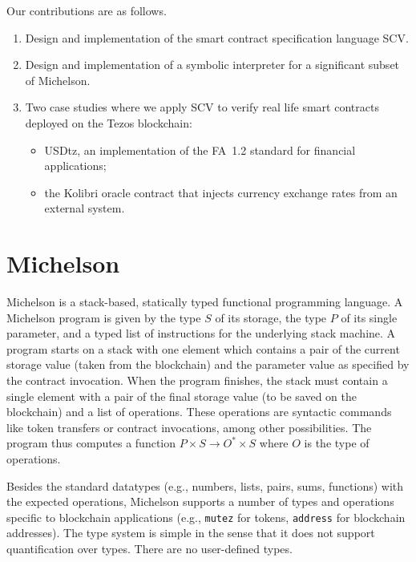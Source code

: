 \documentclass[a4paper,USenglish,cleveref, autoref, thm-restate]{lipics-v2021}
\begin{document}
Our contributions are as follows.
\begin{enumerate}
\item Design and implementation of the smart contract specification
  language SCV.
\item Design and implementation of a symbolic interpreter for a
  significant subset of Michelson.
\item Two case studies where we apply SCV to verify real life smart
  contracts deployed on the Tezos blockchain:
  \begin{itemize}
  \item USDtz, an implementation of the FA~1.2 standard for financial
    applications;
  \item the Kolibri oracle contract that injects currency exchange
    rates from an external system.
  \end{itemize}
\end{enumerate}

\section{Michelson}
\label{sec:background}
\lstset{language=michelson}

Michelson is a stack-based, statically typed functional programming language.
A Michelson program is given by the type $S$ of its storage, the type $P$ of its single
parameter, and a typed list of instructions for the underlying stack machine.
A program starts on a stack with one element which contains a pair of
the current storage value (taken from the blockchain) and the
parameter value as specified by the
contract invocation.
When the program finishes, the stack must contain a single element with a pair
of the final storage value (to be saved on the blockchain) and a list
of operations.
These operations are syntactic commands like token transfers or
contract invocations, among other possibilities.
The program thus computes a function $P\times S \to O^* \times S$
where $O$ is the type of operations.

Besides the standard datatypes (e.g., numbers, lists, pairs, sums, functions)
with the expected operations,
Michelson supports a number of types and operations specific to blockchain applications (e.g.,
\texttt{mutez} for tokens, \texttt{address} for blockchain
addresses). The type system is simple in the sense that it does not
support quantification over types. There are no user-defined types.
\end{document}
